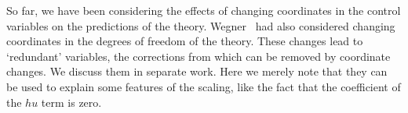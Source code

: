 \documentclass[
 reprint,
 amsmath,amssymb,
 aps, superscriptaddress, pre
]{revtex4-1}
\begin{document}
So far, we have been considering the effects of changing coordinates in the control variables on the predictions of the theory. Wegner~\cite{wegner1974some} had also considered changing coordinates in the degrees of freedom of the theory. These changes lead to `redundant' variables, the corrections from which can be removed by coordinate changes. We discuss them in separate work. Here we merely note that they can be used to explain some features of the scaling, like the fact that the coefficient of the $h u$ term is zero.




\end{document}
